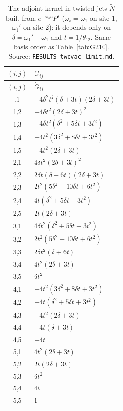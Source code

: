 \documentclass[11pt]{article}
\begin{document}
{\scriptsize
\begin{longtable}{cp{13.5cm}}
\caption{The adjoint kernel in twisted jets $\tilde N$ built from $e^{-\omega_su}P^j$ ($\omega_s=\omega_1$ on site 1, $\omega_1'$ on site 2): it depends only on $\delta=\omega_1'-\omega_1$ and $t=1/\theta_{12}$. Same basis order as Table~\ref{tab:G210}.
Source: \texttt{RESULTS-\allowbreak{}twovac-\allowbreak{}limit.\allowbreak{}md}.}\label{tab:Gtw}\\
\toprule
$(i,j)$ & $\tilde G_{ij}$ \\
\midrule
\endfirsthead
\toprule
$(i,j)$ & $\tilde G_{ij}$ \\
\midrule
\endhead
\bottomrule
\endlastfoot
1,1 & $-4 \delta^{2} t^{2} (\delta + 3 t)(2 \delta + 3 t)$ \\
1,2 & $-4 \delta t^{2} (2 \delta + 3 t)^{2}$ \\
1,3 & $-4 \delta t^{2} (\delta^{2} + 5 \delta t + 3 t^{2})$ \\
1,4 & $-4 t^{2} (3 \delta^{2} + 8 \delta t + 3 t^{2})$ \\
1,5 & $-4 t^{2} (2 \delta + 3 t)$ \\
2,1 & $4 \delta t^{2} (2 \delta + 3 t)^{2}$ \\
2,2 & $2 \delta t (\delta + 6 t)(2 \delta + 3 t)$ \\
2,3 & $2 t^{2} (5 \delta^{2} + 10 \delta t + 6 t^{2})$ \\
2,4 & $4 t (\delta^{2} + 5 \delta t + 3 t^{2})$ \\
2,5 & $2 t (2 \delta + 3 t)$ \\
3,1 & $4 \delta t^{2} (\delta^{2} + 5 \delta t + 3 t^{2})$ \\
3,2 & $2 t^{2} (5 \delta^{2} + 10 \delta t + 6 t^{2})$ \\
3,3 & $2 \delta t^{2} (\delta + 6 t)$ \\
3,4 & $4 t^{2} (2 \delta + 3 t)$ \\
3,5 & $6 t^{2}$ \\
4,1 & $-4 t^{2} (3 \delta^{2} + 8 \delta t + 3 t^{2})$ \\
4,2 & $-4 t (\delta^{2} + 5 \delta t + 3 t^{2})$ \\
4,3 & $-4 t^{2} (2 \delta + 3 t)$ \\
4,4 & $-4 t (\delta + 3 t)$ \\
4,5 & $-4 t$ \\
5,1 & $4 t^{2} (2 \delta + 3 t)$ \\
5,2 & $2 t (2 \delta + 3 t)$ \\
5,3 & $6 t^{2}$ \\
5,4 & $4 t$ \\
5,5 & $1$ \\
\end{longtable}}
\end{document}
